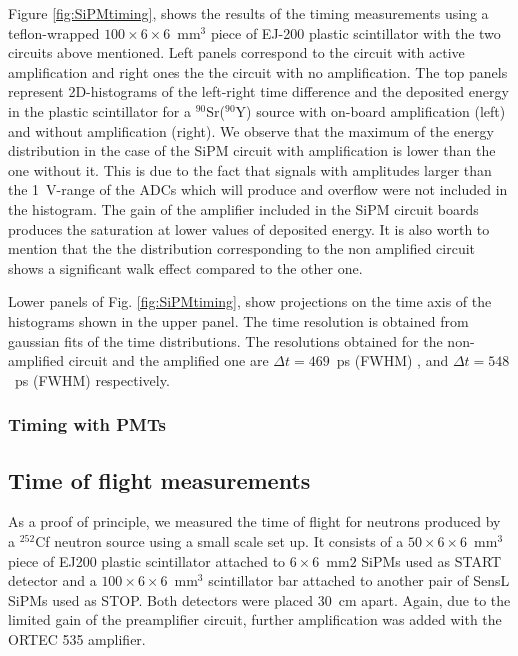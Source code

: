 \documentclass[preprint,3p,twocolumn]{elsarticle}
\begin{document}
Figure \ref{fig:SiPMtiming}, shows the results of the timing measurements using a  teflon-wrapped $100\times6\times6$~mm$^3$ piece of EJ-200 plastic scintillator with the two circuits above mentioned. Left panels correspond to the circuit with active amplification and right ones the the circuit with no amplification. The top panels represent  2D-histograms of the left-right time difference  and the deposited energy in the plastic scintillator for a $^{90}$Sr($^{90}$Y) source with on-board amplification (left) and without amplification (right). We observe that the maximum of the energy distribution in the case of the SiPM circuit with amplification is lower than the one without it. This is due to the fact that signals with amplitudes larger than the 1~V-range of the ADCs which will produce and overflow were not included in the histogram. The gain of the amplifier included in the SiPM circuit boards produces the saturation at lower values of deposited energy. It is also worth to mention that the the distribution corresponding to the non amplified circuit shows a significant walk effect compared to the other one.

Lower panels of Fig. \ref{fig:SiPMtiming}, show projections on the time axis of the histograms shown in the upper panel. The time resolution is obtained from  gaussian fits of the time distributions. The resolutions obtained for the non-amplified circuit and the amplified one are $\Delta t=469$~ps (FWHM) , and   $\Delta t=548$~ps (FWHM) respectively.


 
\subsubsection{Timing with PMTs}


\subsection{Time of flight measurements}

As a proof of principle, we measured the time of flight for neutrons produced by a $^{252}$Cf neutron source using a small scale set up. It consists of a $50\times6\times6$~mm$^3$  piece of EJ200 plastic scintillator attached to $6\times6$~mm$2$ SiPMs used as START detector and a  $100\times6\times6$~mm$^3$ scintillator bar attached to another pair of SensL\textsuperscript{\textregistered}  SiPMs used as STOP. Both detectors were placed 30~cm apart. Again, due to the limited gain of the preamplifier circuit, further amplification was added with the ORTEC\textsuperscript{\textregistered}  535 amplifier. 
\end{document}
